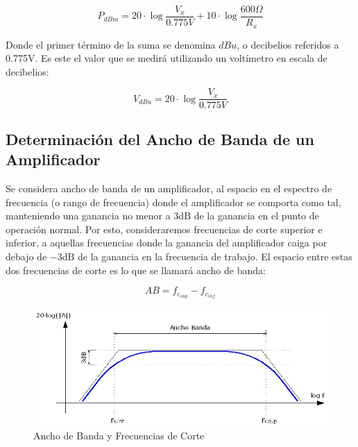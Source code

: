 \begin{equation}\label{eq::PotConVolReferidoa775mV}
    P_{dBm} = 20\cdot\log{\frac{V_x}{0.775V}} + 10\cdot\log{\frac{600\Omega}{R_x}}
\end{equation}


Donde el primer término de la suma se denomina  $dBu$, o decibelios referidos a 0.775V. Es este el valor que se medirá utilizando un voltímetro en escala de decibelios:


\begin{equation}\label{eq::VolReferidoa775mV}
    V_{dBu} = 20\cdot\log{\frac{V_x}{0.775V}}
\end{equation}





\vspace{1.5cm}
\subsection{Determinación del Ancho de Banda de un Amplificador}

Se considera ancho de banda de un amplificador, al espacio en el espectro de frecuencia (o rango de frecuencia) donde el amplificador se comporta como tal, manteniendo una ganancia no menor a $3 \mathrm{dB}$ de la ganancia en el punto de operación normal. Por esto, consideraremos frecuencias de corte superior e inferior, a aquellas frecuencias donde la ganancia del amplificador caiga por debajo de $-3 \mathrm{dB}$ de la ganancia en la frecuencia de trabajo. El espacio entre estas dos frecuencias de corte es lo que se llamará ancho de banda:

\begin{equation}
    AB = f_{c_{sup}} - f_{c_{inf}}
    \label{eq:ABresta}
\end{equation}

\begin{figure}[h]
    \centering
    \includegraphics[width=0.9\linewidth]{Imagenes/AnchoBanda.jpg}
    \caption{Ancho de Banda y Frecuencias de Corte}
    \label{fig:AB}
\end{figure}

